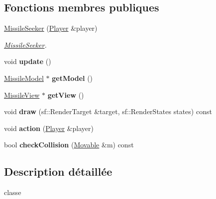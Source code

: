 \subsection*{Fonctions membres publiques}
\begin{DoxyCompactItemize}
\item 
\hyperlink{class_missile_seeker_a6922e808d9ef9f3a9ce4d7ae949d3580}{Missile\+Seeker} (\hyperlink{class_player}{Player} \&player)
\begin{DoxyCompactList}\small\item\em \hyperlink{class_missile_seeker}{Missile\+Seeker}. \end{DoxyCompactList}\item 
\hypertarget{class_missile_seeker_ad41be5d57a072ad43cc6a416ce053582}{void {\bfseries update} ()}\label{class_missile_seeker_ad41be5d57a072ad43cc6a416ce053582}

\item 
\hypertarget{class_missile_seeker_afc6407617c662f1c53e7e8c12eb87cf1}{\hyperlink{class_missile_model}{Missile\+Model} $\ast$ {\bfseries get\+Model} ()}\label{class_missile_seeker_afc6407617c662f1c53e7e8c12eb87cf1}

\item 
\hypertarget{class_missile_seeker_a82a26214b57568e654c96529902ab238}{\hyperlink{class_missile_view}{Missile\+View} $\ast$ {\bfseries get\+View} ()}\label{class_missile_seeker_a82a26214b57568e654c96529902ab238}

\item 
\hypertarget{class_missile_seeker_aee67596de4e3d4f4cf67e2e5e0b458ae}{void {\bfseries draw} (sf\+::\+Render\+Target \&target, sf\+::\+Render\+States states) const }\label{class_missile_seeker_aee67596de4e3d4f4cf67e2e5e0b458ae}

\item 
\hypertarget{class_missile_seeker_ac45dbee8338a8b3f535b59260de3cdb4}{void {\bfseries action} (\hyperlink{class_player}{Player} \&player)}\label{class_missile_seeker_ac45dbee8338a8b3f535b59260de3cdb4}

\item 
\hypertarget{class_missile_seeker_a61fa7cad3e96df34cbad583919f97474}{bool {\bfseries check\+Collision} (\hyperlink{class_movable}{Movable} \&m) const }\label{class_missile_seeker_a61fa7cad3e96df34cbad583919f97474}

\end{DoxyCompactItemize}


\subsection{Description détaillée}
classe 


